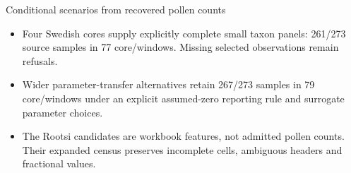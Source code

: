 \begin{frame}{Conditional scenarios from recovered pollen counts}
\small
\begin{itemize}
\item Four Swedish cores supply explicitly complete small taxon panels: 261/273 source samples in 77 core/windows. Missing selected observations remain refusals.
\item Wider parameter-transfer alternatives retain 267/273 samples in 79 core/windows under an explicit assumed-zero reporting rule and surrogate parameter choices.
\item The Rootsi candidates are workbook features, not admitted pollen counts. Their expanded census preserves incomplete cells, ambiguous headers and fractional values.
\end{itemize}
\end{frame}

